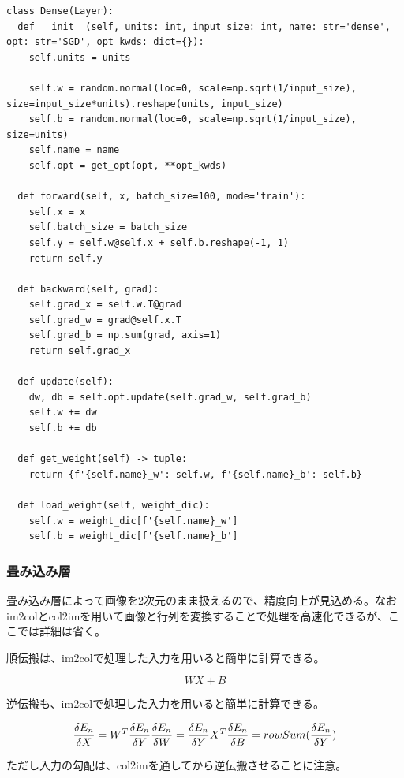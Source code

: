 \documentclass[platex,dvipdfmx]{jsarticle}
\begin{document}
\begin{lstlisting}[caption=ex\_advanced.py, label=Dense]
class Dense(Layer):
  def __init__(self, units: int, input_size: int, name: str='dense', opt: str='SGD', opt_kwds: dict={}):
    self.units = units

    self.w = random.normal(loc=0, scale=np.sqrt(1/input_size), size=input_size*units).reshape(units, input_size)
    self.b = random.normal(loc=0, scale=np.sqrt(1/input_size), size=units)
    self.name = name
    self.opt = get_opt(opt, **opt_kwds)

  def forward(self, x, batch_size=100, mode='train'):
    self.x = x
    self.batch_size = batch_size
    self.y = self.w@self.x + self.b.reshape(-1, 1)
    return self.y

  def backward(self, grad):
    self.grad_x = self.w.T@grad
    self.grad_w = grad@self.x.T
    self.grad_b = np.sum(grad, axis=1)
    return self.grad_x

  def update(self):
    dw, db = self.opt.update(self.grad_w, self.grad_b)
    self.w += dw
    self.b += db

  def get_weight(self) -> tuple:
    return {f'{self.name}_w': self.w, f'{self.name}_b': self.b}

  def load_weight(self, weight_dic):
    self.w = weight_dic[f'{self.name}_w']
    self.b = weight_dic[f'{self.name}_b']
\end{lstlisting}

\newpage

\subsubsection{畳み込み層}

畳み込み層によって画像を2次元のまま扱えるので、精度向上が見込める。なおim2colとcol2imを用いて画像と行列を変換することで処理を高速化できるが、ここでは詳細は省く。

順伝搬は、im2colで処理した入力を用いると簡単に計算できる。

\[
  WX + B
\]

逆伝搬も、im2colで処理した入力を用いると簡単に計算できる。

\[
  \frac{\delta E_n}{\delta X} = W^T \frac{\delta E_n}{\delta Y} \\
  \frac{\delta E_n}{\delta W} = \frac{\delta E_n}{\delta Y} X^T \\
  \frac{\delta E_n}{\delta B} = rowSum(\frac{\delta E_n}{\delta Y})
\]

ただし入力の勾配は、col2imを通してから逆伝搬させることに注意。
\end{document}
